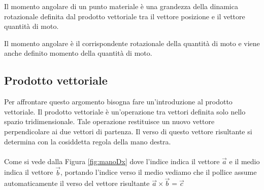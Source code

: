 Il momento angolare di un punto materiale è una grandezza della dinamica rotazionale definita dal prodotto vettoriale tra il vettore posizione e il vettore quantità di moto.

Il momento angolare è il corrispondente rotazionale della quantità di moto e viene anche definito momento della quantità di moto.


\subsection{Prodotto vettoriale}
Per affrontare questo argomento bisogna fare un'introduzione al prodotto vettoriale. 
Il prodotto vettoriale è un’operazione tra vettori definita solo nello spazio tridimensionale. Tale operazione restituisce un nuovo vettore perpendicolare ai due vettori di partenza. Il verso di questo vettore risultante si determina con la cosiddetta regola della mano destra.
\paragraph{}
Come si vede dalla Figura \ref{fig:manoDx} dove l'indice indica il vettore $\vec{a}$ e il medio indica il vettore $\vec{b}$, portando l'indice verso il medio vediamo che il pollice assume automaticamente il verso del vettore risultante $\vec{a} \times \vec{b} = \vec{c}$

